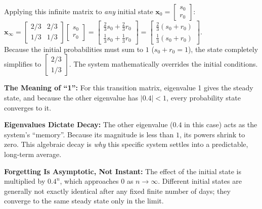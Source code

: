 \begin{solution}
Applying this infinite matrix to \textit{any} initial state $\mathbf{x}_0 = \begin{bmatrix} s_0 \\ r_0 \end{bmatrix}$: \\
$\mathbf{x}_\infty = \begin{bmatrix} 2/3 & 2/3 \\ 1/3 & 1/3 \end{bmatrix} \begin{bmatrix} s_0 \\ r_0 \end{bmatrix} = \begin{bmatrix} \frac{2}{3}s_0 + \frac{2}{3}r_0 \\ \frac{1}{3}s_0 + \frac{1}{3}r_0 \end{bmatrix} = \begin{bmatrix} \frac{2}{3}(s_0+r_0) \\ \frac{1}{3}(s_0+r_0) \end{bmatrix}$. \\
Because the initial probabilities must sum to $1$ ($s_0+r_0 = 1$), the state completely simplifies to \textbf{$\begin{bmatrix} 2/3 \\ 1/3 \end{bmatrix}$}. The system mathematically overrides the initial conditions.
\end{solution}

\begin{takeaways}
\item \textbf{The Meaning of ``1'':} For this transition matrix, eigenvalue 1 gives the steady state, and because the other eigenvalue has $|0.4| < 1$, every probability state converges to it.
\item \textbf{Eigenvalues Dictate Decay:} The other eigenvalue ($0.4$ in this case) acts as the system's ``memory''. Because its magnitude is less than $1$, its powers shrink to zero. This algebraic decay is \textit{why} this specific system settles into a predictable, long-term average.
\item \textbf{Forgetting Is Asymptotic, Not Instant:} The effect of the initial state is multiplied by $0.4^n$, which approaches $0$ as $n\to\infty$. Different initial states are generally not exactly identical after any fixed finite number of days; they converge to the same steady state only in the limit.
\end{takeaways}

